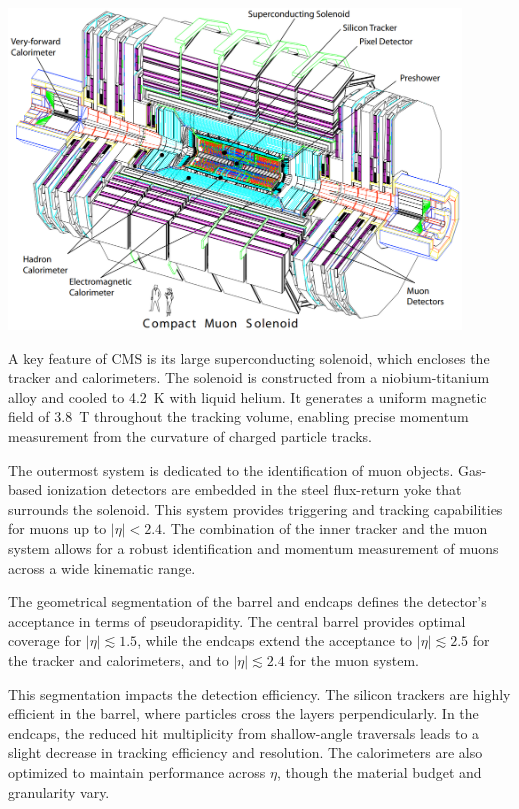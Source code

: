\begin{center}
	\includegraphics[width=0.9\textwidth]{Images/CMS.png}
	\label{fig_cms}
\end{center}

A key feature of CMS is its large superconducting solenoid, which encloses the tracker and calorimeters. The solenoid is constructed from a niobium-titanium alloy and cooled to 4.2~K with liquid helium. It generates a uniform magnetic field of 3.8~T throughout the tracking volume, enabling precise momentum measurement from the curvature of charged particle tracks.

The outermost system is dedicated to the identification of muon objects. Gas-based ionization detectors are embedded in the steel flux-return yoke that surrounds the solenoid. This system provides triggering and tracking capabilities for muons up to $|\eta| < 2.4$. The combination of the inner tracker and the muon system allows for a robust identification and momentum measurement of muons across a wide kinematic range.

The geometrical segmentation of the barrel and endcaps defines the detector's acceptance in terms of pseudorapidity. The central barrel provides optimal coverage for $|\eta| \lesssim 1.5$, while the endcaps extend the acceptance to $|\eta| \lesssim 2.5$ for the tracker and calorimeters, and to $|\eta| \lesssim 2.4$ for the muon system.

This segmentation impacts the detection efficiency. The silicon trackers are highly efficient in the barrel, where particles cross the layers perpendicularly. In the endcaps, the reduced hit multiplicity from shallow-angle traversals leads to a slight decrease in tracking efficiency and resolution. The calorimeters are also optimized to maintain performance across $\eta$, though the material budget and granularity vary.

